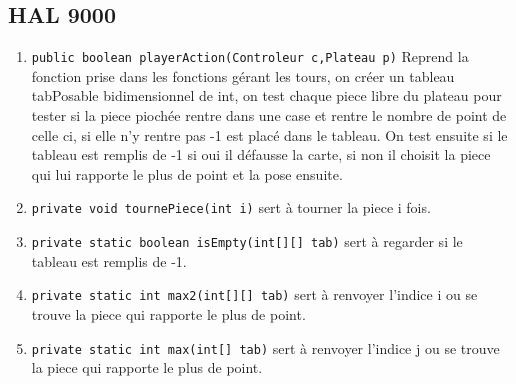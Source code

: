 \documentclass[11pt]{article}
\begin{document}
\subsection{HAL 9000}
\label{sec:org3b46aa2}
\begin{enumerate}
\item \texttt{public boolean playerAction(Controleur c,Plateau p)} Reprend la fonction prise dans les fonctions gérant les tours, on créer un tableau tabPosable bidimensionnel de int, on test chaque piece libre du plateau pour tester si la piece piochée rentre dans une case et rentre le nombre de point de celle ci, si elle n'y rentre pas -1 est placé dans le tableau. On test ensuite si le tableau est remplis de -1 si oui il défausse la carte, si non il choisit la piece qui lui rapporte le plus de point et la pose ensuite.
\item \texttt{private void tournePiece(int i)} sert à tourner la piece i fois.
\item \texttt{private static boolean isEmpty(int[][] tab)} sert à regarder si le tableau est remplis de -1.
\item \texttt{private static int max2(int[][] tab)} sert à renvoyer l'indice i ou se trouve la piece qui rapporte le plus de point.
\item \texttt{private static int max(int[] tab)} sert à renvoyer l'indice j ou se trouve la piece qui rapporte le plus de point.
\end{enumerate}
\end{document}
